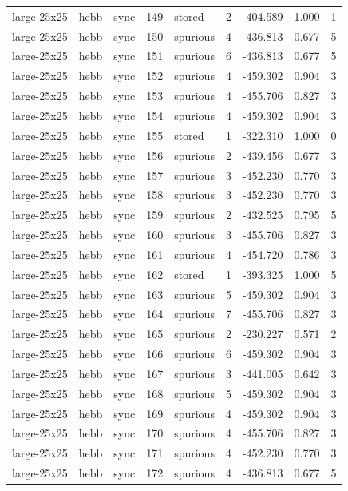 \begin{tabular}{lllrlrrrr}
large-25x25 & hebb & sync & 149 & stored & 2 & -404.589 & 1.000 & 1 \\
large-25x25 & hebb & sync & 150 & spurious & 4 & -436.813 & 0.677 & 5 \\
large-25x25 & hebb & sync & 151 & spurious & 6 & -436.813 & 0.677 & 5 \\
large-25x25 & hebb & sync & 152 & spurious & 4 & -459.302 & 0.904 & 3 \\
large-25x25 & hebb & sync & 153 & spurious & 4 & -455.706 & 0.827 & 3 \\
large-25x25 & hebb & sync & 154 & spurious & 4 & -459.302 & 0.904 & 3 \\
large-25x25 & hebb & sync & 155 & stored & 1 & -322.310 & 1.000 & 0 \\
large-25x25 & hebb & sync & 156 & spurious & 2 & -439.456 & 0.677 & 3 \\
large-25x25 & hebb & sync & 157 & spurious & 3 & -452.230 & 0.770 & 3 \\
large-25x25 & hebb & sync & 158 & spurious & 3 & -452.230 & 0.770 & 3 \\
large-25x25 & hebb & sync & 159 & spurious & 2 & -432.525 & 0.795 & 5 \\
large-25x25 & hebb & sync & 160 & spurious & 3 & -455.706 & 0.827 & 3 \\
large-25x25 & hebb & sync & 161 & spurious & 4 & -454.720 & 0.786 & 3 \\
large-25x25 & hebb & sync & 162 & stored & 1 & -393.325 & 1.000 & 5 \\
large-25x25 & hebb & sync & 163 & spurious & 5 & -459.302 & 0.904 & 3 \\
large-25x25 & hebb & sync & 164 & spurious & 7 & -455.706 & 0.827 & 3 \\
large-25x25 & hebb & sync & 165 & spurious & 2 & -230.227 & 0.571 & 2 \\
large-25x25 & hebb & sync & 166 & spurious & 6 & -459.302 & 0.904 & 3 \\
large-25x25 & hebb & sync & 167 & spurious & 3 & -441.005 & 0.642 & 3 \\
large-25x25 & hebb & sync & 168 & spurious & 5 & -459.302 & 0.904 & 3 \\
large-25x25 & hebb & sync & 169 & spurious & 4 & -459.302 & 0.904 & 3 \\
large-25x25 & hebb & sync & 170 & spurious & 4 & -455.706 & 0.827 & 3 \\
large-25x25 & hebb & sync & 171 & spurious & 4 & -452.230 & 0.770 & 3 \\
large-25x25 & hebb & sync & 172 & spurious & 4 & -436.813 & 0.677 & 5 \\

\end{tabular}
